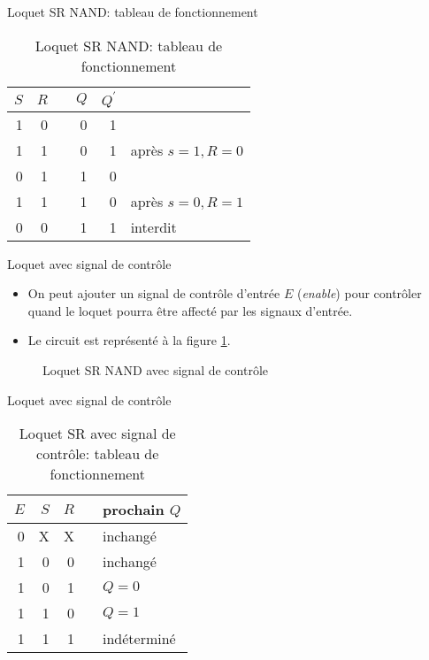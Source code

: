 \documentclass[presentation]{beamer}
\begin{document}
\begin{frame}[label={sec:orge5788d1}]{Loquet SR NAND: tableau de fonctionnement}
\begin{table}[htbp]
\caption{\label{tab:org9b24499}Loquet SR NAND: tableau de fonctionnement}
\centering
\begin{tabular}{rrlrrl}
\(S\) & \(R\) &  & \(Q\) & \(Q^\prime\) & \\[0pt]
\hline
1 & 0 &  & 0 & 1 & \\[0pt]
1 & 1 &  & 0 & 1 & après \(s=1, R=0\)\\[0pt]
0 & 1 &  & 1 & 0 & \\[0pt]
1 & 1 &  & 1 & 0 & après \(s=0, R=1\)\\[0pt]
0 & 0 &  & 1 & 1 & interdit\\[0pt]
\end{tabular}
\end{table}
\end{frame}

\begin{frame}[label={sec:orga714de8}]{Loquet avec signal de contrôle}
\begin{itemize}
\item On peut ajouter un signal de contrôle d'entrée \(E\) (\emph{enable}) pour contrôler \alert{quand} le loquet pourra être affecté par les signaux d'entrée.

\item Le circuit est représenté à la figure \ref{fig:org7d9914e}.
\end{itemize}

\begin{figure}[htbp]
\centering

\caption{\label{fig:org7d9914e}Loquet SR NAND avec signal de contrôle}
\end{figure}
\end{frame}

\begin{frame}[label={sec:orgcee8728}]{Loquet avec signal de contrôle}
\begin{table}[htbp]
\caption{\label{tab:org41c6c2d}Loquet SR avec signal de contrôle: tableau de fonctionnement}
\centering
\begin{tabular}{rrrll}
\(E\) & \(S\) & \(R\) &  & prochain \(Q\)\\[0pt]
\hline
0 & X & X &  & inchangé\\[0pt]
1 & 0 & 0 &  & inchangé\\[0pt]
1 & 0 & 1 &  & \(Q = 0\)\\[0pt]
1 & 1 & 0 &  & \(Q = 1\)\\[0pt]
1 & 1 & 1 &  & indéterminé\\[0pt]
\end{tabular}
\end{table}
\end{frame}
\end{document}
